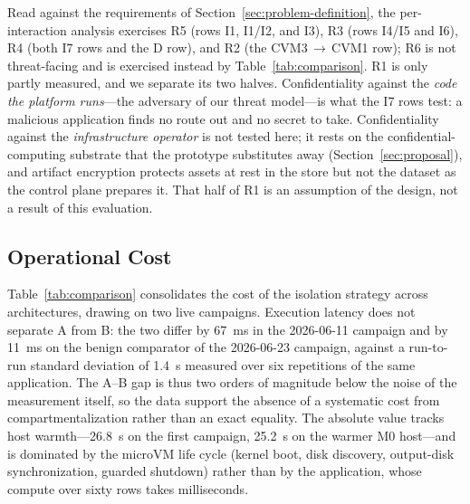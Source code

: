 Read against the requirements of Section~\ref{sec:problem-definition}, the per-interaction
analysis exercises R5 (rows I1, I1/I2, and I3), R3 (rows I4/I5 and I6), R4 (both I7 rows
and the D row), and R2 (the CVM3\,$\to$\,CVM1 row); R6 is not threat-facing and is
exercised instead by Table~\ref{tab:comparison}. R1 is only partly measured, and we
separate its two halves. Confidentiality against the \emph{code the platform runs}---the
adversary of our threat model---is what the I7 rows test: a malicious application finds no
route out and no secret to take. Confidentiality against the \emph{infrastructure
operator} is not tested here; it rests on the confidential-computing substrate that the
prototype substitutes away (Section~\ref{sec:proposal}), and artifact encryption protects
assets at rest in the store but not the dataset as the control plane prepares it. That half
of R1 is an assumption of the design, not a result of this evaluation.

\subsection{Operational Cost}

Table~\ref{tab:comparison} consolidates the cost of the isolation strategy across
architectures, drawing on two live campaigns. Execution latency does not separate A from B:
the two differ by 67~ms in the 2026-06-11 campaign and by 11~ms on the benign comparator of
the 2026-06-23 campaign, against a run-to-run standard deviation of 1.4~s measured over six
repetitions of the same application. The A--B gap is thus two orders of magnitude below the
noise of the measurement itself, so the data support the absence of a systematic cost from
compartmentalization rather than an exact equality. The absolute value tracks host
warmth---26.8~s on the first campaign, 25.2~s on the warmer M0 host---and is dominated by
the microVM life cycle (kernel boot, disk discovery, output-disk synchronization, guarded
shutdown) rather than by the application, whose compute over sixty rows takes milliseconds.

